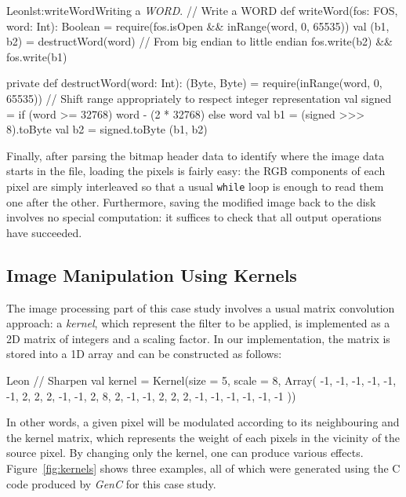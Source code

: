 \documentclass[a4paper,twoside]{article}
\newcommand{\InlineS}[1]{\lstinline[language=Leon]|#1|}
\newcommand{\GenC}{\emph{GenC}\xspace}
\newcommand{\RefFig}[1]{Figure~\ref{#1}}
\begin{document}
\begin{Code}{Leon}{lst:writeWord}{Writing a \emph{WORD}.}
// Write a WORD
def writeWord(fos: FOS, word: Int): Boolean = {
  require(fos.isOpen && inRange(word, 0, 65535))
  val (b1, b2) = destructWord(word)
  // From big endian to little endian
  fos.write(b2) && fos.write(b1)
}

private def destructWord(word: Int): (Byte, Byte) = {
  require(inRange(word, 0, 65535))
  // Shift range appropriately to respect integer representation
  val signed = if (word >= 32768) word - (2 * 32768) else word
  val b1 = (signed >>> 8).toByte
  val b2 = signed.toByte
  (b1, b2)
}
\end{Code}

\pagebreak
Finally, after parsing the bitmap header data to identify where the image data
starts in the file, loading the pixels is fairly easy: the RGB components of
each pixel are simply interleaved so that a usual \InlineS{while} loop is enough
to read them one after the other. Furthermore, saving the modified image back to
the disk involves no special computation: it suffices to check that all output
operations have succeeded.

\subsection{Image Manipulation Using Kernels}

The image processing part of this case study involves a usual matrix convolution
approach: a \emph{kernel}, which represent the filter to be applied, is
implemented as a 2D matrix of integers and a scaling factor. In our
implementation, the matrix is stored into a 1D array and can be constructed as
follows:
\begin{ShortCode}{Leon}
// Sharpen
val kernel = Kernel(size = 5, scale = 8, Array(
  -1, -1, -1, -1, -1,
  -1,  2,  2,  2, -1,
  -1,  2,  8,  2, -1,
  -1,  2,  2,  2, -1,
  -1, -1, -1, -1, -1
))
\end{ShortCode}

In other words, a given pixel will be modulated according to its neighbouring
and the kernel matrix, which represents the weight of each pixels in the vicinity
of the source pixel. By changing only the kernel, one can produce various
effects. \RefFig{fig:kernels} shows three examples, all of which were generated
using the C code produced by \GenC for this case study.
\end{document}
